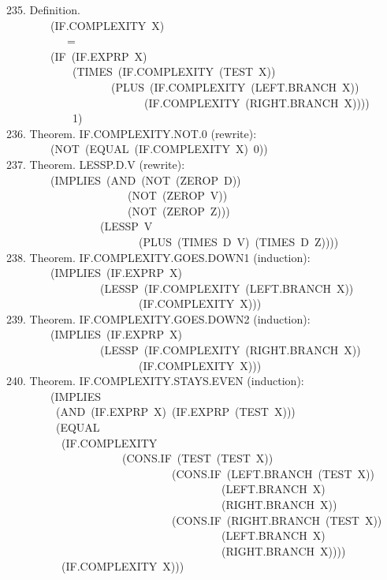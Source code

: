 \documentclass[10pt]{book}
\newenvironment{pubasis}{\begin{flushleft}}{\end{flushleft}}
\begin{document}
\begin{pubasis}
235.    Definition.\\
~~~~~~~~(IF.COMPLEXITY~X)\\
~~~~~~~~~~~=\\
~~~~~~~~(IF~(IF.EXPRP~X)\\
~~~~~~~~~~~~(TIMES~(IF.COMPLEXITY~(TEST~X))\\
~~~~~~~~~~~~~~~~~~~(PLUS~(IF.COMPLEXITY~(LEFT.BRANCH~X))\\
~~~~~~~~~~~~~~~~~~~~~~~~~(IF.COMPLEXITY~(RIGHT.BRANCH~X))))\\
~~~~~~~~~~~~1)\\

236.    Theorem.  IF.COMPLEXITY.NOT.0 (rewrite):\\
~~~~~~~~(NOT~(EQUAL~(IF.COMPLEXITY~X)~0))\\

237.    Theorem.  LESSP.D.V (rewrite):\\
~~~~~~~~(IMPLIES~(AND~(NOT~(ZEROP~D))\\
~~~~~~~~~~~~~~~~~~~~~~(NOT~(ZEROP~V))\\
~~~~~~~~~~~~~~~~~~~~~~(NOT~(ZEROP~Z)))\\
~~~~~~~~~~~~~~~~~(LESSP~V\\
~~~~~~~~~~~~~~~~~~~~~~~~(PLUS~(TIMES~D~V)~(TIMES~D~Z))))\\

238.    Theorem.  IF.COMPLEXITY.GOES.DOWN1 (induction):\\
~~~~~~~~(IMPLIES~(IF.EXPRP~X)\\
~~~~~~~~~~~~~~~~~(LESSP~(IF.COMPLEXITY~(LEFT.BRANCH~X))\\
~~~~~~~~~~~~~~~~~~~~~~~~(IF.COMPLEXITY~X)))\\

239.    Theorem.  IF.COMPLEXITY.GOES.DOWN2 (induction):\\
~~~~~~~~(IMPLIES~(IF.EXPRP~X)\\
~~~~~~~~~~~~~~~~~(LESSP~(IF.COMPLEXITY~(RIGHT.BRANCH~X))\\
~~~~~~~~~~~~~~~~~~~~~~~~(IF.COMPLEXITY~X)))\\

240.    Theorem.  IF.COMPLEXITY.STAYS.EVEN (induction):\\
~~~~~~~~(IMPLIES\\
~~~~~~~~~(AND~(IF.EXPRP~X)~(IF.EXPRP~(TEST~X)))\\
~~~~~~~~~(EQUAL\\
~~~~~~~~~~(IF.COMPLEXITY\\
~~~~~~~~~~~~~~~~~~~~~(CONS.IF~(TEST~(TEST~X))\\
~~~~~~~~~~~~~~~~~~~~~~~~~~~~~~(CONS.IF~(LEFT.BRANCH~(TEST~X))\\
~~~~~~~~~~~~~~~~~~~~~~~~~~~~~~~~~~~~~~~(LEFT.BRANCH~X)\\
~~~~~~~~~~~~~~~~~~~~~~~~~~~~~~~~~~~~~~~(RIGHT.BRANCH~X))\\
~~~~~~~~~~~~~~~~~~~~~~~~~~~~~~(CONS.IF~(RIGHT.BRANCH~(TEST~X))\\
~~~~~~~~~~~~~~~~~~~~~~~~~~~~~~~~~~~~~~~(LEFT.BRANCH~X)\\
~~~~~~~~~~~~~~~~~~~~~~~~~~~~~~~~~~~~~~~(RIGHT.BRANCH~X))))\\
~~~~~~~~~~(IF.COMPLEXITY~X)))\\


\end{pubasis}
\end{document}
